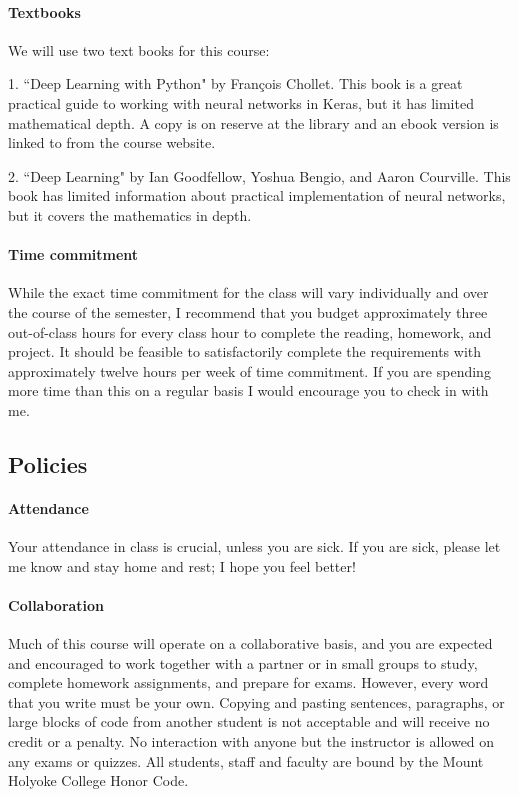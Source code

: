\documentclass[11pt]{article}
\begin{document}
\paragraph{Textbooks}

We will use two text books for this course:

1. ``Deep Learning with Python" by Fran\c{c}ois Chollet.  This book is a great practical guide to working with neural networks in Keras, but it has limited mathematical depth.  A copy is on reserve at the library and an ebook version is linked to from the course website.

2. ``Deep Learning" by Ian Goodfellow, Yoshua Bengio, and Aaron Courville.  This book has limited information about practical implementation of neural networks, but it covers the mathematics in depth.

\paragraph{Time commitment}

While the exact time commitment for the class will vary individually and over the course of the semester, I recommend that you budget approximately three out-of-class hours for every class hour to complete the reading, homework, and project.  It should be feasible to satisfactorily complete the requirements with approximately twelve hours per week of time commitment.  If you are spending more time than this on a regular basis I would encourage you to check in with me.

\subsection*{Policies}

\paragraph{Attendance}
Your attendance in class is crucial, unless you are sick.  If you are sick, please let me know and stay home and rest; I hope you feel better!

\paragraph{Collaboration}
Much of this course will operate on a collaborative basis, and you are expected and encouraged to work together with a partner or in small groups to study, complete homework assignments, and prepare for exams. However, every word that you write must be your own. Copying and pasting sentences, paragraphs, or large blocks of code from another student is not acceptable and will receive no credit or a penalty. No interaction with 
anyone but the instructor is allowed on any exams or quizzes.  All students, staff and faculty are bound by the Mount Holyoke College Honor Code.
\end{document}
